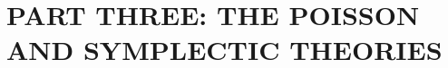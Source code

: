 \documentclass{report}
\begin{document}






\part{PART THREE: THE POISSON AND SYMPLECTIC THEORIES}








\end{document}
